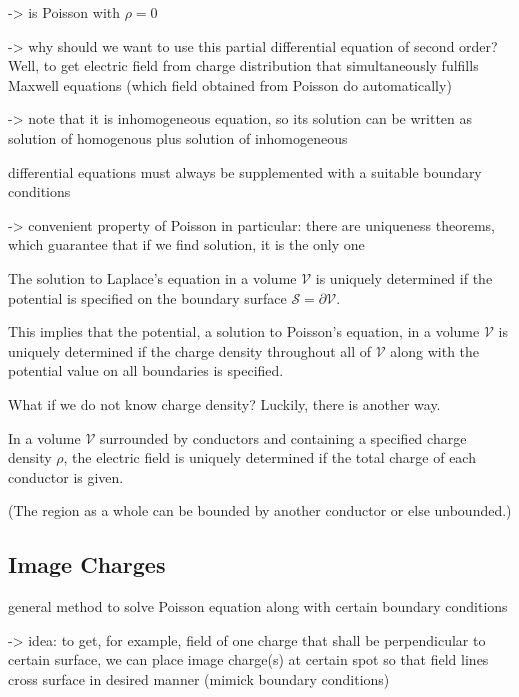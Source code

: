 \documentclass[../class_mech_main.tex]{subfiles}
\begin{document}
->  is Poisson with $\rho = 0$

-> why should we want to use this partial differential equation of second order? Well, to get electric field from charge distribution that simultaneously fulfills Maxwell equations (which field obtained from Poisson do automatically)

-> note that it is inhomogeneous equation, so its solution can be written as solution of homogenous plus solution of inhomogeneous



differential equations must always be supplemented with a suitable boundary conditions

-> convenient property of Poisson in particular: there are uniqueness theorems, which guarantee that if we find solution, it is the only one

\begin{thm}\label{thm:uniqueness_poisson_1}
    The solution to Laplace's equation in a volume $\mathcal{V}$ is uniquely determined if the potential is specified on the boundary surface $\mathcal{S} = \partial \mathcal{V}$.

    This implies that the potential, a solution to Poisson's equation, in a volume $\mathcal{V}$ is uniquely determined if the charge density throughout all of $\mathcal{V}$ along with the potential value on all boundaries is specified.
\end{thm}


What if we do not know charge density? Luckily, there is another way.

\begin{thm}\label{thm:uniqueness_poisson_2}
    In a volume $\mathcal{V}$ surrounded by conductors and containing a specified charge density $\rho$, the electric field is uniquely determined if the total charge of each conductor is given.
\end{thm}
(The region as a whole can be bounded by another conductor or else unbounded.)



        \subsection{Image Charges}
general method to solve Poisson equation along with certain boundary conditions

-> idea: to get, for example, field of one charge that shall be perpendicular to certain surface, we can place image charge(s) at certain spot so that field lines cross surface in desired manner (mimick boundary conditions)
\end{document}
